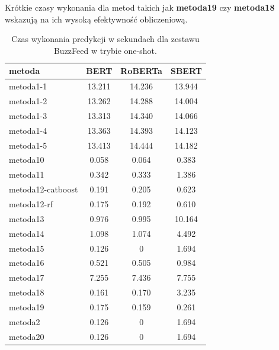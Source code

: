 Krótkie czasy wykonania dla metod takich jak \textbf{metoda19} czy \textbf{metoda18} wskazują na ich wysoką efektywność obliczeniową.

\begin{table}[H]
	\centering
	\caption{Czas wykonania predykcji w sekundach dla zestawu BuzzFeed w trybie one-shot.}
	\label{tab:execution_time_one_shot}
	\small
	\begin{tabular}{lccc}
		\toprule
		\textbf{metoda}   & \textbf{BERT} & \textbf{RoBERTa} & \textbf{SBERT} \\
		\midrule
		metoda1-1         & 13.211        & 14.236           & 13.944         \\
		metoda1-2         & 13.262        & 14.288           & 14.004         \\
		metoda1-3         & 13.313        & 14.340           & 14.066         \\
		metoda1-4         & 13.363        & 14.393           & 14.123         \\
		metoda1-5         & 13.413        & 14.444           & 14.182         \\
		metoda10          & 0.058         & 0.064            & 0.383          \\
		metoda11          & 0.342         & 0.333            & 1.386          \\
		metoda12-catboost & 0.191         & 0.205            & 0.623          \\
		metoda12-rf       & 0.175         & 0.192            & 0.610          \\
		metoda13          & 0.976         & 0.995            & 10.164         \\
		metoda14          & 1.098         & 1.074            & 4.492          \\
		metoda15          & 0.126         &   0              & 1.694          \\
		metoda16          & 0.521         & 0.505            & 0.984          \\
		metoda17          & 7.255         & 7.436            & 7.755          \\
		metoda18          & 0.161         & 0.170            & 3.235          \\
		metoda19          & 0.175         & 0.159            & 0.261          \\
		metoda2           & 0.126         &   0              & 1.694          \\
		metoda20          & 0.126         &   0              & 1.694          \\

\end{tabular}
\end{table}
